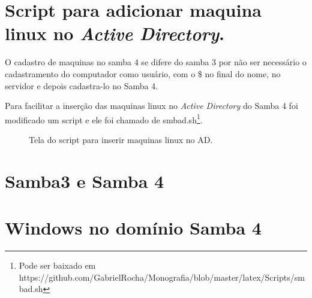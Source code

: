 \section{Script para adicionar maquina linux no \textit{Active Directory}.}

O cadastro de maquinas no samba 4 se difere do samba 3 por não ser necessário o cadastramento do computador como usuário, com o \$ no final do nome, no servidor e depois cadastra-lo no Samba 4.

Para facilitar a inserção das maquinas linux no \textit{Active Directory} do Samba 4 foi modificado um script e ele foi chamado de smbad.sh\footnote[4]{Pode ser baixado em https://github.com/GabrielRocha/Monografia/blob/master/latex/Scripts/smbad.sh}. 

\begin{figure}[ht]
   	\centering
   	\caption{Tela do script para inserir maquinas linux no AD.}
    \label{smbad}
\end{figure}

\section{Samba3 e Samba 4}




\section{Windows no domínio Samba 4}